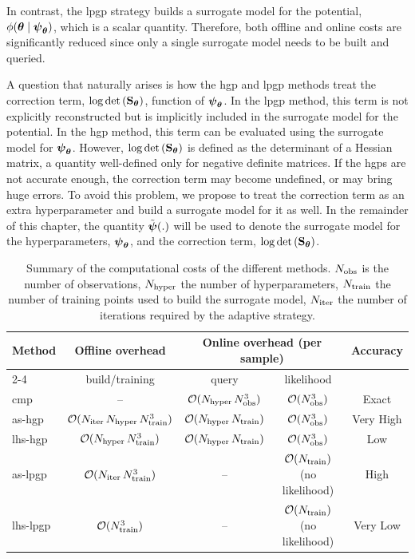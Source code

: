 \smallskip
In contrast, the \gls{lpgp} strategy builds a surrogate model for the potential, $\phi(\boldsymbol{\theta} \mid \boldsymbol{\psi}_{\boldsymbol{\theta}})$, which is a scalar quantity. Therefore, both offline and online costs are significantly reduced since only a single surrogate model needs to be built and queried.

\smallskip
A question that naturally arises is how the \gls{hgp} and \gls{lpgp} methods treat the correction term, $\log \mathrm{det}\left(\mathbf{S}_{\boldsymbol{\theta}}\right)$, function of $\boldsymbol{\psi}_{\boldsymbol{\theta}}$. In the \gls{lpgp} method, this term is not explicitly reconstructed but is implicitly included in the surrogate model for the potential. In the \gls{hgp} method, this term can be evaluated using the surrogate model for $\boldsymbol{\psi}_{\boldsymbol{\theta}}$. However, $\log \mathrm{det}\left(\mathbf{S}_{\boldsymbol{\theta}}\right)$ is defined as the determinant of a Hessian matrix, a quantity well-defined only for negative definite matrices. If the \glspl{hgp} are not accurate enough, the correction term may become undefined, or may bring huge errors. To avoid this problem, we propose to treat the correction term as an extra hyperparameter and build a surrogate model for it as well. In the remainder of this chapter, the quantity $\tilde{\boldsymbol{\psi}}(.)$ will be used to denote the surrogate model for the hyperparameters, $\boldsymbol{\psi}_{\boldsymbol{\theta}}$, and the correction term, $\log \mathrm{det}\left(\mathbf{S}_{\boldsymbol{\theta}}\right)$.

\begin{table}[htbp]
  \centering
  \small
  \begin{tabular}{|l|c|c|c|c|}
    \hline
    \textbf{Method} 
    & \multicolumn{1}{c|}{\textbf{Offline overhead}} 
    & \multicolumn{2}{c|}{\textbf{Online overhead (per sample)}}
    & \textbf{Accuracy} \\
    \cline{2-4}
    & build/training 
    & query 
    & likelihood 
    &  \\
    \hline
    \gls{cmp}
    & -- 
    & $\mathcal{O}(N_{\mathrm{hyper}}\,N_{\mathrm{obs}}^3)$ 
    & $\mathcal{O}(N_{\mathrm{obs}}^3)$
    & Exact \\
    \hline
    \gls{as}-\gls{hgp} 
    & $\mathcal{O}({N_{\mathrm{iter}}} \, N_{\mathrm{hyper}} \, N_{\mathrm{train}}^3)$ 
    & $\mathcal{O}(N_{\mathrm{hyper}}\,N_{\mathrm{train}})$ 
    & $\mathcal{O}(N_{\mathrm{obs}}^3)$
    & Very High \\
    \hline
    \gls{lhs}-\gls{hgp} 
    & $\mathcal{O}(N_{\mathrm{hyper}} \, N_{\mathrm{train}}^3)$ 
    & $\mathcal{O}(N_{\mathrm{hyper}}\,N_{\mathrm{train}})$ 
    & $\mathcal{O}(N_{\mathrm{obs}}^3)$
    & Low \\
    \hline
    \gls{as}-\gls{lpgp} 
    & $\mathcal{O}({N_{\mathrm{iter}}} \, N_{\mathrm{train}}^3)$ 
    & -- 
    & $\mathcal{O}(N_{\mathrm{train}})$ (no likelihood)
    & High \\
    \hline
    \gls{lhs}-\gls{lpgp} 
    & $\mathcal{O}(N_{\mathrm{train}}^3)$ 
    & -- 
    & $\mathcal{O}(N_{\mathrm{train}})$ (no likelihood)
    & Very Low \\
    \hline
  \end{tabular}
  \caption{Summary of the computational costs of the different methods. $N_{\mathrm{obs}}$ is the number of observations, $N_{\mathrm{hyper}}$ the number of hyperparameters, $N_{\mathrm{train}}$ the number of training points used to build the surrogate model, ${N_{\mathrm{iter}}}$ the number of iterations required by the adaptive strategy.}
  \label{tab:method_costs_small}
\end{table}


